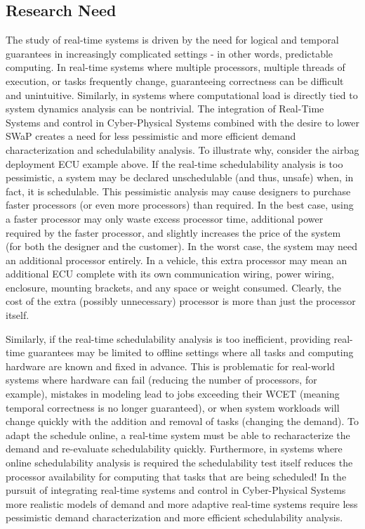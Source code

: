 \subsection{Research Need}
The study of real-time systems is driven by the need for logical and temporal guarantees in increasingly complicated settings - in other words, predictable computing.
In real-time systems where multiple processors, multiple threads of execution, or tasks frequently change, guaranteeing correctness can be difficult and unintuitive.
Similarly, in systems where computational load is directly tied to system dynamics analysis can be nontrivial.
The integration of Real-Time Systems and control in Cyber-Physical Systems combined with the desire to lower SWaP creates a need for less pessimistic and more efficient demand characterization and schedulability analysis.
To illustrate why, consider the airbag deployment ECU example above.
If the real-time schedulability analysis is too pessimistic, a system may be declared unschedulable (and thus, unsafe) when, in fact, it is schedulable.
This pessimistic analysis may cause designers to purchase faster processors (or even more processors) than required.
In the best case, using a faster processor may only waste excess processor time, additional power required by the faster processor, and slightly increases the price of the system (for both the designer and the customer).
In the worst case, the system may need an additional processor entirely.
In a vehicle, this extra processor may mean an additional ECU complete with its own communication wiring, power wiring, enclosure, mounting brackets, and any space or weight consumed.
Clearly, the cost of the extra (possibly unnecessary) processor is more than just the processor itself.

Similarly, if the real-time schedulability analysis is too inefficient, providing real-time guarantees may be limited to offline settings where all tasks and computing hardware are known and fixed in advance.
This is problematic for real-world systems where hardware can fail (reducing the number of processors, for example), mistakes in modeling lead to jobs exceeding their WCET (meaning temporal correctness is no longer guaranteed), or when system workloads will change quickly with the addition and removal of tasks (changing the demand).
To adapt the schedule online, a real-time system must be able to recharacterize the demand and re-evaluate schedulability quickly.
Furthermore, in systems where online schedulability analysis is required the schedulability test itself reduces the processor availability for computing that tasks that are being scheduled!
In the pursuit of integrating real-time systems and control in Cyber-Physical Systems more realistic models of demand and more adaptive real-time systems require less pessimistic demand characterization and more efficient schedulability analysis. 

